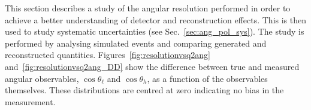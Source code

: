 This section describes a study of the angular resolution performed in order to achieve a better understanding
of detector and reconstruction effects. This is then used to study systematic uncertainties (see Sec.~\ref{sec:ang_pol_sys}).
The study is performed by analysing simulated events and comparing generated and reconstructed quantities.
Figures~\ref{fig:resolutionvsq2ang} and~\ref{fig:resolutionvsq2ang_DD} show the difference between true and measured 
angular observables, $\cos \theta_\ell$ and $\cos \theta_h$, as a function of the observables themselves.
These distributions are centred at zero indicating no bias in the measurement.
%
\begin{table}[b]
\centering
\caption{Average angular resolutions for downstream and long candidates.} %
\label{tab:resolutions}
\end{table}
%

